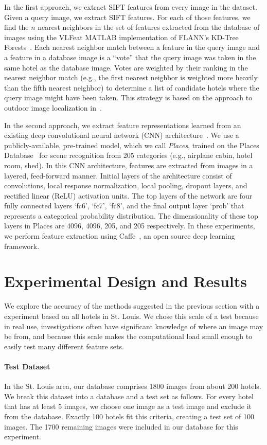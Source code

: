 In the first approach, we extract SIFT features from every image in the dataset. Given a query image, we extract SIFT features. For each of those features, we find the $n$ nearest neighbors in the set of features extracted from the database of images using the VLFeat MATLAB implementation of FLANN's KD-Tree Forests~\cite{vedaldi08vlfeat}. Each nearest neighbor match between a feature in the query image and a feature in a database image is a ``vote'' that the query image was taken in the same hotel as the database image. Votes are weighted by their ranking in the nearest neighbor match (e.g., the first nearest neighbor is weighted more heavily than the fifth nearest neighbor) to determine a list of candidate hotels where the query image might have been taken. This strategy is based on the approach to outdoor image localization in~\cite{Zamir10}.

In the second approach, we  extract feature representations learned from an existing deep convolutional neural network (CNN) architecture~\cite{krizhevsky2012imagenet}. We use a publicly-available, pre-trained model, which we call \emph{Places}, trained on the Places Database~\cite{zhou2014places} for scene recognition from 205 categories (e.g., airplane cabin, hotel room, shed). In this CNN architecture, features are extracted from images in a layered, feed-forward manner. Initial layers of the architecture consist of convolutions, local response normalization, local pooling, dropout layers, and rectified
linear (ReLU) activation units. The top layers of the network are four fully connected layers `fc6', `fc7', `fc8', and the final output layer `prob' that represents a categorical probability distribution. The
dimensionality of these top layers in Places are 4096, 4096, 205, and 205 respectively. In these experiments, we perform feature extraction using Caffe~\cite{jia2014caffe}, an open source deep learning framework.  

\section{Experimental Design and Results}
We explore the accuracy of the methods suggested in the previous section with a experiment based on all hotels in St. Louis.  We chose this scale of a test because in real use, investigations often have significant knowledge of where an image may be from, and because this scale makes the computational load small enough to easily test many different feature sets.

\paragraph{Test Dataset} In the St. Louis area, our database comprises 1800 images from about 200 hotels.  We break this dataset into a database and a test set as follows.  For every hotel that has at least 5 images, we choose one image as a test image and exclude it from the database.  Exactly 100 hotels fit this criteria, creating a test set of 100 images.  The 1700 remaining images were included in our database for this experiment.

